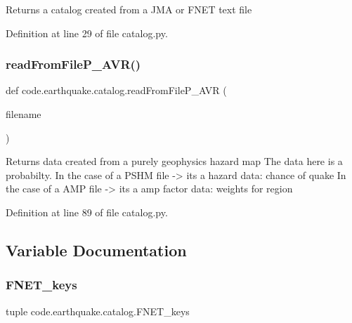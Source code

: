 \begin{DoxyVerb}Returns a catalog created from a JMA or FNET text file
\end{DoxyVerb}
 

Definition at line 29 of file catalog.\+py.

\mbox{\label{namespacecode_1_1earthquake_1_1catalog_aa3246dbaba4b4ad94b343d1f47dd62c6}} 
\subsubsection{\texorpdfstring{read\+From\+File\+P\+\_\+\+A\+V\+R()}{readFromFileP\_AVR()}}
{\footnotesize\ttfamily def code.\+earthquake.\+catalog.\+read\+From\+File\+P\+\_\+\+A\+VR (\begin{DoxyParamCaption}\item[{}]{filename }\end{DoxyParamCaption})}

\begin{DoxyVerb}Returns data created from a purely geophysics hazard map
The data here is a probabilty. 
    In the case of a PSHM file -> its a hazard data: chance of quake
    In the case of a AMP file -> its a amp factor data: weights for region
\end{DoxyVerb}
 

Definition at line 89 of file catalog.\+py.



\subsection{Variable Documentation}
\mbox{\label{namespacecode_1_1earthquake_1_1catalog_abc746f43da50a4fa624e73eb53490484}} 
\subsubsection{\texorpdfstring{F\+N\+E\+T\+\_\+keys}{FNET\_keys}}
{\footnotesize\ttfamily tuple code.\+earthquake.\+catalog.\+F\+N\+E\+T\+\_\+keys}

